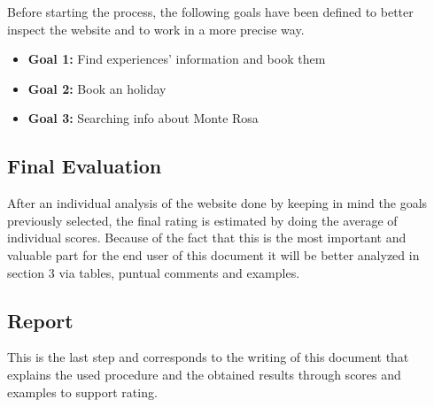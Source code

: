 Before starting the process, the following goals have been defined to better inspect the website and to work in a more precise way.
\begin{itemize}
	\item \textbf{Goal 1:} Find experiences' information and book them
	\item \textbf{Goal 2:} Book an holiday
	\item \textbf{Goal 3:} Searching info about Monte Rosa

\end{itemize}


\subsection{Final Evaluation}
After an individual analysis of the website done by keeping in mind the goals previously selected, the final rating is estimated by doing the average of individual scores. Because of the fact that this is the most important and valuable part for the end user of this document it will be better analyzed in section 3 via tables, puntual comments and examples.


\subsection{Report}
This is the last step and corresponds to the writing of this document that explains the used procedure and the obtained results through scores and examples to support rating.
